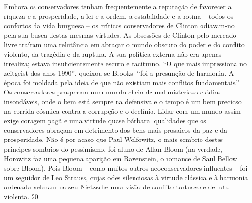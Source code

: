  
\par
 
Embora os conservadores tenham frequentemente a reputação de favorecer a riqueza e a prosperidade, a lei e a ordem, a estabilidade e a rotina – todos os confortos da vida burguesa – os críticos conservadores de Clinton odiavam-no pela sua busca destas mesmas virtudes. As obsessões de Clinton pelo mercado livre traíram uma relutância em abraçar o mundo obscuro do poder e do conflito violento, da tragédia e da ruptura. A sua política externa não era apenas irrealiza; estava insuficientemente escuro e taciturno. “O que mais impressiona no zeitgeist dos anos 1990”, queixou-se Brooks, “foi a presunção de harmonia. A época foi moldada pela ideia de que não existiam mais conflitos fundamentais.” Os conservadores prosperam num mundo cheio de mal misterioso e ódios insondáveis, onde o bem está sempre na defensiva e o tempo é um bem precioso na corrida cósmica contra a corrupção e o declínio. Lidar com um mundo assim exige coragem pagã e uma virtude quase bárbara, qualidades que os conservadores abraçam em detrimento dos bens mais prosaicos da paz e da prosperidade. Não é por acaso que Paul Wolfowitz, o mais sombrio destes príncipes sombrios do pessimismo, foi aluno de Allan Bloom (na verdade, Horowitz faz uma pequena aparição em Ravenstein, o romance de Saul Bellow sobre Bloom). Pois Bloom – como muitos outros neoconservadores influentes – foi um seguidor de Leo Strauss, cujas odes silenciosas à virtude clássica e à harmonia ordenada velaram no seu Nietzsche uma visão de conflito tortuoso e de luta violenta.
 {\color{blue} 20}  

 
\par
 
